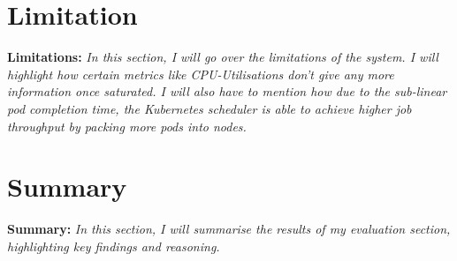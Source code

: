 \section{Limitation}
\begin{tcolorbox}[boxsep=0mm,left=2.5mm,right=2.5mm]
    \textbf{Limitations:} {\em In this section, I will go over the limitations
    of the system. I will highlight how certain metrics like CPU-Utilisations
    don't give any more information once saturated. I will also have to mention
    how due to the sub-linear pod completion time, the Kubernetes scheduler is
    able to achieve higher job throughput by packing more pods into nodes.
    }
\end{tcolorbox}

\section{Summary}
\begin{tcolorbox}[boxsep=0mm,left=2.5mm,right=2.5mm]
    \textbf{Summary:} {\em In this section, I will summarise the results of my
    evaluation section, highlighting key findings and reasoning.
    }
\end{tcolorbox}

